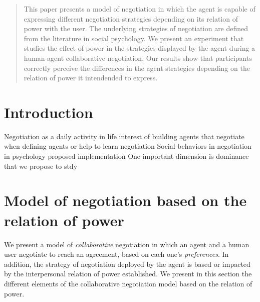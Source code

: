 \documentclass[runningheads,a4paper]{llncs}
\begin{document}
	
	\begin{abstract}
		
		
		This paper presents a model of negotiation in which the agent is capable of expressing different negotiation strategies depending on its relation of power with the user. The underlying strategies of negotiation are defined from the literature in social psychology. We present an experiment that studies the effect of power in the strategies displayed by the agent during a human-agent collaborative negotiation. Our results show that participants correctly perceive the differences in the agent strategies depending on the relation of power it intendended to express.
		
		
	\end{abstract}
	
	
	\section{Introduction}
	Negotiation as a daily activity in life
	interest of building agents that negotiate when defining agents or help to learn negotiation
	Social behaviors in negotiation in psychology
	proposed implementation 
	One important dimension is dominance that we propose to stdy
	
	
	\section{Model of negotiation based on the relation of power}
	We present a model of \textit{collaborative} negotiation in which an agent and a human user negotiate to reach an agreement, based on each one's \textit{preferences}. In addition, the strategy of negotiation deployed by the agent is based or impacted by the interpersonal relation of power established.
	We present in this section the different elements of the collaborative negotiation model based on the relation of power.
\end{document}

